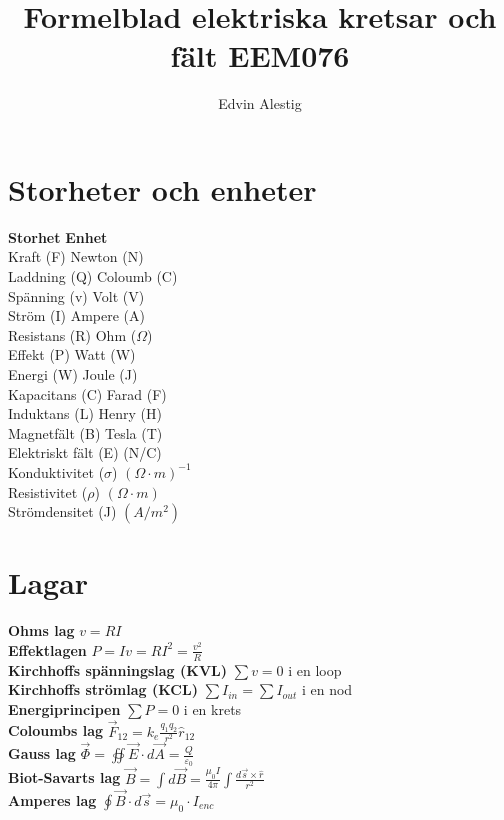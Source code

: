 \documentclass{article}
\title{Formelblad elektriska kretsar och fält EEM076}
\author{Edvin Alestig}
\begin{document}
\maketitle

\section{Storheter och enheter}

\textbf{Storhet} \tab \textbf{Enhet}
\\
Kraft (F) \tab Newton (N)
\\
Laddning (Q)  \tab Coloumb (C)
\\
Spänning (v) \tab Volt (V)
\\
Ström (I) \tab Ampere (A)
\\
Resistans (R) \tab Ohm ($\Omega$)
\\
Effekt (P) \tab Watt (W)
\\
Energi (W) \tab Joule (J)
\\
Kapacitans (C) \tab Farad (F)
\\
Induktans (L) \tab Henry (H)
\\
Magnetfält (B) \tab Tesla (T)
\\
Elektriskt fält (E) \tab (N/C)
\\
Konduktivitet (\(\sigma\)) \tab \( ( \Omega \cdot m )^{-1} \)
\\
Resistivitet (\(\rho\)) \tab \(( \Omega \cdot m )\)
\\
Strömdensitet (J) \tab \((A/m^2)\)

\section{Lagar}

\textbf{Ohms lag} \tab  $ v=RI $
\\
\textbf{Effektlagen} \tab  $ P = Iv = RI^2 = \frac{v^2}{R} $
\\
\textbf{Kirchhoffs spänningslag (KVL)} \tab $ \sum v = 0 $  i en loop
\\
\textbf{Kirchhoffs strömlag (KCL)} \tab $ \sum I_{in} = \sum I_{out} $  i en nod
\\
\textbf{Energiprincipen} \tab $ \sum P = 0 $ i en krets
\\
\textbf{Coloumbs lag} \tab \( \vec{F}_{12} = k_e \frac{q_1q_2}{r^2} \hat{r}_{12} \)
\\
\textbf{Gauss lag} \tab \( \vec{\Phi} = \oiint \vec{E} \cdot d\vec{A} = \frac{Q}{\varepsilon_0} \)
\\
\textbf{Biot-Savarts lag} \tab \( \vec{B} = \int d\vec{B} = \frac{\mu_0I}{4\pi} \int \frac{d\vec{s} \times \hat{r}}{r^2} \)
\\
\textbf{Amperes lag} \tab \( \oint \vec{B} \cdot d\vec{s} = \mu_0 \cdot I_{enc} \)
\end{document}
